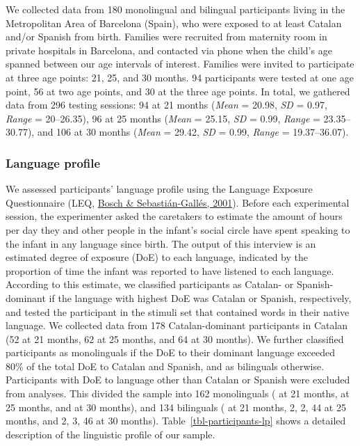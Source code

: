 \documentclass[
  letterpaper,
  DIV=11,
  numbers=noendperiod]{scrartcl}
\begin{document}
We collected data from 180 monolingual and bilingual participants living
in the Metropolitan Area of Barcelona (Spain), who were exposed to at
least Catalan and/or Spanish from birth. Families were recruited from
maternity room in private hospitals in Barcelona, and contacted via
phone when the child's age spanned between our age intervals of
interest. Families were invited to participate at three age points: 21,
25, and 30 months. 94 participants were tested at one age point, 56 at
two age points, and 30 at the three age points. In total, we gathered
data from 296 testing sessions: 94 at 21 months (\emph{Mean} = 20.98,
\emph{SD} = 0.97, \emph{Range} = 20--26.35), 96 at 25 months
(\emph{Mean} = 25.15, \emph{SD} = 0.99, \emph{Range} = 23.35--30.77),
and 106 at 30 months (\emph{Mean} = 29.42, \emph{SD} = 0.99,
\emph{Range} = 19.37--36.07).

\hypertarget{sec-lp}{%
\subsubsection{Language profile}\label{sec-lp}}

We assessed participants' language profile using the Language Exposure
Questionnaire (LEQ, \protect\hyperlink{ref-bosch2001evidence}{Bosch \&
Sebastián-Gallés, 2001}). Before each experimental session, the
experimenter asked the caretakers to estimate the amount of hours per
day they and other people in the infant's social circle have spent
speaking to the infant in any language since birth. The output of this
interview is an estimated degree of exposure (DoE) to each language,
indicated by the proportion of time the infant was reported to have
listened to each language. According to this estimate, we classified
participants as Catalan- or Spanish-dominant if the language with
highest DoE was Catalan or Spanish, respectively, and tested the
participant in the stimuli set that contained words in their native
language. We collected data from 178 Catalan-dominant participants in
Catalan (52 at 21 months, 62 at 25 months, and 64 at 30 months). We
further classified participants as monolinguals if the DoE to their
dominant language exceeded 80\% of the total DoE to Catalan and Spanish,
and as bilinguals otherwise. Participants with DoE to language other
than Catalan or Spanish were excluded from analyses. This divided the
sample into 162 monolinguals ( at 21 months, at 25 months, and at 30
months), and 134 bilinguals ( at 21 months, 2, 2, 44 at 25 months, and
2, 3, 46 at 30 months). Table~\ref{tbl-participants-lp} shows a detailed
description of the linguistic profile of our sample.
\end{document}

